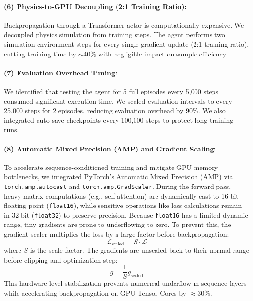 \documentclass[11pt,a4paper]{article}
\begin{document}
\paragraph{(6) Physics-to-GPU Decoupling (2:1 Training Ratio):}
Backpropagation through a Transformer actor is computationally expensive. We decoupled physics simulation from training steps. The agent performs two simulation environment steps for every single gradient update (2:1 training ratio), cutting training time by $\sim$40\% with negligible impact on sample efficiency.

\paragraph{(7) Evaluation Overhead Tuning:}
We identified that testing the agent for 5 full episodes every 5,000 steps consumed significant execution time. We scaled evaluation intervals to every 25,000 steps for 2 episodes, reducing evaluation overhead by 90\%. We also integrated auto-save checkpoints every 100,000 steps to protect long training runs.

\paragraph{(8) Automatic Mixed Precision (AMP) and Gradient Scaling:}
To accelerate sequence-conditioned training and mitigate GPU memory bottlenecks, we integrated PyTorch's Automatic Mixed Precision (AMP) via \texttt{torch.amp.autocast} and \texttt{torch.amp.GradScaler}. During the forward pass, heavy matrix computations (e.g., self-attention) are dynamically cast to 16-bit floating point (\texttt{float16}), while sensitive operations like loss calculations remain in 32-bit (\texttt{float32}) to preserve precision. Because \texttt{float16} has a limited dynamic range, tiny gradients are prone to underflowing to zero. To prevent this, the gradient scaler multiplies the loss by a large factor before backpropagation:
\begin{equation}
\mathcal{L}_{\text{scaled}} = S \cdot \mathcal{L}
\end{equation}
where $S$ is the scale factor. The gradients are unscaled back to their normal range before clipping and optimization step:
\begin{equation}
g = \frac{1}{S} g_{\text{scaled}}
\end{equation}
This hardware-level stabilization prevents numerical underflow in sequence layers while accelerating backpropagation on GPU Tensor Cores by $\approx 30\%$.
\end{document}
